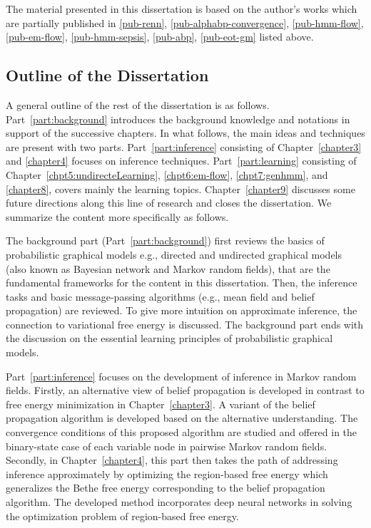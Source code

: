 The material presented in this dissertation is based on the author's works which are partially published in \ref{pub-renn}, \ref{pub-alphabp-convergence}, \ref{pub-hmm-flow}, \ref{pub-em-flow}, \ref{pub-hmm-sepsis}, \ref{pub-abp}, \ref{pub-eot-gm} listed above.
\subsection{Outline of the Dissertation}

A general outline of the rest of the dissertation is as follows. Part~\ref{part:background} introduces the background knowledge and notations in support of the successive chapters. In what follows, the main ideas and techniques are present with two parts. Part~\ref{part:inference} consisting of Chapter~\ref{chapter3} and \ref{chapter4} focuses on inference techniques. Part~\ref{part:learning} consisting of Chapter~\ref{chpt5:undirecteLearning}, \ref{chpt6:em-flow}, \ref{chpt7:genhmm}, and \ref{chapter8}, covers mainly the learning topics. Chapter~\ref{chapter9} discusses some future directions along this line of research and closes the dissertation. We summarize the content more specifically as follows.

The background part (Part~\ref{part:background}) first reviews the basics of probabilistic graphical models e.g., directed and undirected graphical models (also known as Bayesian network and Markov random fields), that are the fundamental frameworks for the content in this dissertation. Then, the inference tasks and basic message-passing algorithms (e.g., mean field and belief propagation) are reviewed. To give more intuition on approximate inference, the connection to variational free energy is discussed. The background part ends with the discussion on the essential learning principles of probabilistic graphical models.

Part~\ref{part:inference} focuses on the development of inference in Markov random fields. Firstly, an alternative view of belief propagation is developed in contrast to free energy minimization in Chapter~\ref{chapter3}. A variant of the belief propagation algorithm is developed based on the alternative understanding. The convergence conditions of this proposed algorithm are studied and offered in the binary-state case of each variable node in pairwise Markov random fields. Secondly, in Chapter~\ref{chapter4}, this part then takes the path of addressing inference approximately by optimizing the region-based free energy which generalizes the Bethe free energy corresponding to the belief propagation algorithm. The developed method incorporates deep neural networks in solving the optimization problem of region-based free energy.


